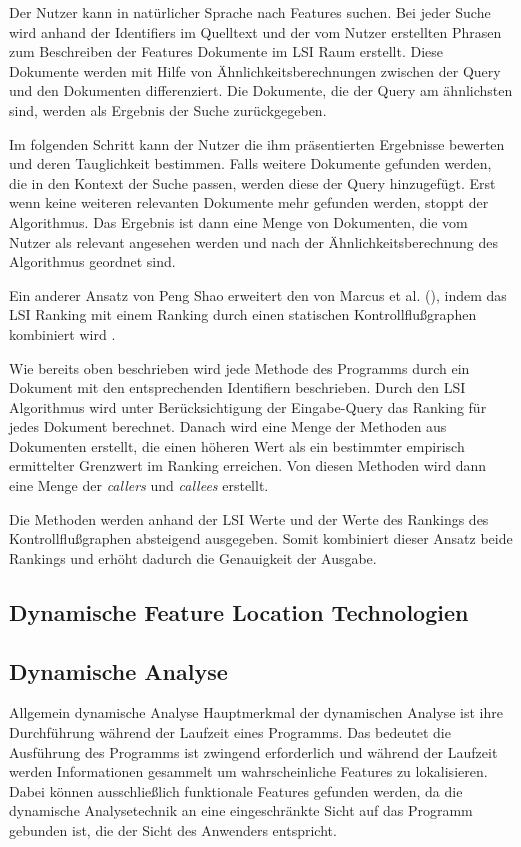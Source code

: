 \documentclass[runningheads,a4paper]{llncs}
\begin{document}
Der Nutzer kann in natürlicher Sprache nach Features suchen. Bei jeder Suche wird anhand der Identifiers im Quelltext und der vom Nutzer erstellten Phrasen zum Beschreiben der Features Dokumente im LSI Raum erstellt. Diese Dokumente werden mit Hilfe von Ähnlichkeitsberechnungen zwischen der Query und den Dokumenten differenziert. Die Dokumente, die der Query am ähnlichsten sind, werden als Ergebnis der Suche zurückgegeben.

Im folgenden Schritt kann der Nutzer die ihm präsentierten Ergebnisse bewerten und deren Tauglichkeit bestimmen. Falls weitere Dokumente gefunden werden, die in den Kontext der Suche passen, werden diese der Query hinzugefügt. Erst wenn keine weiteren relevanten Dokumente mehr gefunden werden, stoppt der Algorithmus. Das Ergebnis ist dann eine Menge von Dokumenten, die vom Nutzer als relevant angesehen werden und nach der Ähnlichkeitsberechnung des Algorithmus geordnet sind.


Ein anderer Ansatz von Peng Shao erweitert den von Marcus et al. (\cite{marcus1}\cite{marcus2}), indem das LSI Ranking mit einem Ranking durch einen statischen Kontrollflußgraphen kombiniert wird \cite{shao}.

Wie bereits oben beschrieben wird jede Methode des Programms durch ein Dokument mit den entsprechenden Identifiern beschrieben. Durch den LSI Algorithmus wird unter Berücksichtigung der Eingabe-Query das Ranking für jedes Dokument berechnet. Danach wird eine Menge der Methoden aus Dokumenten erstellt, die einen höheren Wert als ein bestimmter empirisch ermittelter Grenzwert im Ranking erreichen. Von diesen Methoden wird dann eine Menge der \textit{callers} und \textit{callees} erstellt.

Die Methoden werden anhand der LSI Werte und der Werte des Rankings des Kontrollflußgraphen absteigend ausgegeben. Somit kombiniert dieser Ansatz beide Rankings und erhöht dadurch die Genauigkeit der Ausgabe.

\subsection{Dynamische Feature Location Technologien}


\subsection*{Dynamische Analyse}
Allgemein dynamische Analyse
Hauptmerkmal der dynamischen Analyse ist ihre Durchführung während der Laufzeit eines Programms. Das bedeutet die Ausführung des Programms ist zwingend erforderlich und während der Laufzeit werden Informationen gesammelt um wahrscheinliche Features zu lokalisieren. Dabei können ausschließlich funktionale Features gefunden werden, da die dynamische Analysetechnik an eine eingeschränkte Sicht auf das Programm gebunden ist, die der Sicht des Anwenders entspricht. 
\end{document}
